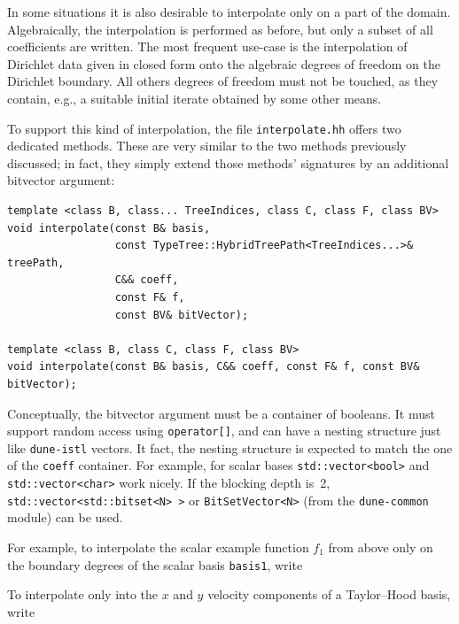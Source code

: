 \documentclass[a4paper,10pt,headings=normal,bibliography=totoc]{scrartcl}
\newcommand{\cpp}[1]{\lstinline[basicstyle=\ttfamily]!#1!}
\newcommand{\dunemodule}[1]{\texttt{#1}}
\newcommand{\file}[1]{\texttt{#1}}
\begin{document}
\bigskip

In some situations it is also desirable to interpolate only on a part of the domain.  Algebraically, the interpolation
is performed as before, but only a subset of all coefficients are written.  The most frequent use-case is the interpolation
of Dirichlet data given in closed form onto the algebraic degrees of freedom on the Dirichlet boundary.  All others
degrees of freedom must not be touched, as they contain, e.g., a suitable initial iterate obtained by some other
means.

To support this kind of interpolation, the file \file{interpolate.hh} offers two dedicated methods.  These are very
similar to the two methods previously discussed; in fact, they simply extend those methods' signatures by an
additional bitvector argument:
\begin{lstlisting}
template <class B, class... TreeIndices, class C, class F, class BV>
void interpolate(const B& basis,
                 const TypeTree::HybridTreePath<TreeIndices...>& treePath,
                 C&& coeff,
                 const F& f,
                 const BV& bitVector);

template <class B, class C, class F, class BV>
void interpolate(const B& basis, C&& coeff, const F& f, const BV& bitVector);
\end{lstlisting}
Conceptually, the bitvector argument must be a container of booleans.  It must support random access using \cpp{operator[]},
and can have a nesting structure just like \dunemodule{dune-istl} vectors.  It fact, the nesting structure is expected
to match the one of the \cpp{coeff} container.  For example, for scalar bases \cpp{std::vector<bool>} and
\cpp{std::vector<char>} work nicely.  If the blocking depth is~2, \cpp{std::vector<std::bitset<N> >} or
\cpp{BitSetVector<N>} (from the \dunemodule{dune-common} module) can be used.

For example, to interpolate the scalar example function $f_1$ from above only on the boundary degrees of the scalar basis
\cpp{basis1}, write
%

%
To interpolate only into the $x$ and $y$ velocity components of a Taylor--Hood basis, write
%

%
\end{document}
